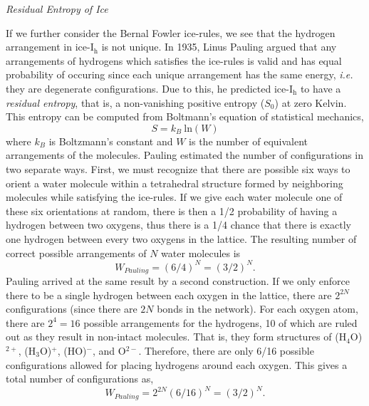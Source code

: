 
\begin{flushleft}
\textit{Residual Entropy of Ice}
\end{flushleft}

If we further consider the Bernal Fowler ice-rules, we see that the
hydrogen arrangement in ice-I$_\mathrm{h}$ is not unique. In 1935,
Linus Pauling argued that any arrangements of hydrogens which
satisfies the ice-rules is valid and has equal probability of
occuring since each unique arrangement has the same energy,
\textit{i.e.} they are degenerate configurations. Due to this, he
predicted ice-I$_\mathrm{h}$ to have a \textit{residual entropy}, that is, a
non-vanishing positive entropy ($S_{0}$) at zero Kelvin. This entropy
can be computed from Boltmann's equation of statistical mechanics,
\begin{equation}\label{eq:Boltzmann-W}
S = k_{B}~\mathrm{ln}(W)
\end{equation}
where $k_{B}$ is Boltzmann's constant and $W$ is the number of
equivalent arrangements of the molecules. Pauling estimated the number
of configurations in two separate ways.\cite{Pauling1935} First, we
must recognize that there are possible six ways to orient a water
molecule within a tetrahedral structure formed by neighboring
molecules while satisfying the ice-rules. If we give each water
molecule one of these six orientations at random, there is then a 1/2
probability of having a hydrogen between two oxygens, thus there is a
1/4 chance that there is exactly one hydrogen between every two
oxygens in the lattice. The resulting number of correct possible
arrangements of $N$ water molecules is
\begin{equation} \label{eq:Pauling-1}
W_{Pauling} = (6/4)^{N} = (3/2)^{N}.
\end{equation}   
Pauling arrived at the same result by a second construction. If we
 only enforce there to be a single hydrogen
between each oxygen in the lattice, there are $2^{2N}$ configurations
(since there are $2N$ bonds in the network). For each oxygen atom,
there are $2^{4} = 16$ possible arrangements for the hydrogens, 10 of
which are ruled out as they result in non-intact
molecules. That is, they form structures of (H$_{4}$O)$^{2+}$,
(H$_{3}$O)$^{+}$, (HO)$^{-}$, and O$^{2-}$. Therefore, there are only
6/16 possible configurations allowed for placing hydrogens around each
oxygen. This gives a total number of configurations as,
\begin{equation}
W_{Pauling} = 2^{2N}(6/16)^{N} = (3/2)^{N}.
\end{equation}
